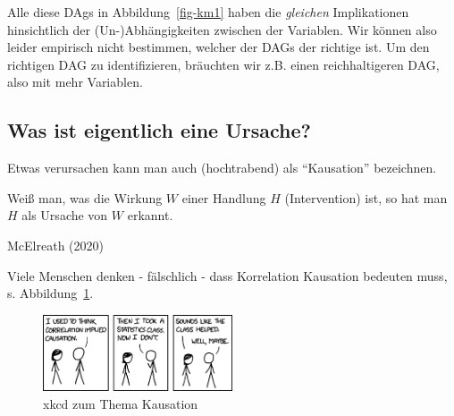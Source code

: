 \documentclass[
  a4paper,
  DIV=11]{scrreprt}
\theoremstyle{definition}
\theoremstyle{remark}
\begin{document}
Alle diese DAgs in Abbildung~\ref{fig-km1} haben die \emph{gleichen}
Implikationen hinsichtlich der (Un-)Abhängigkeiten zwischen der
Variablen. Wir können also leider empirisch nicht bestimmen, welcher der
DAGs der richtige ist. Um den richtigen DAG zu identifizieren, bräuchten
wir z.B. einen reichhaltigeren DAG, also mit mehr Variablen.

\hypertarget{was-ist-eigentlich-eine-ursache}{%
\subsection{Was ist eigentlich eine
Ursache?}\label{was-ist-eigentlich-eine-ursache}}

Etwas verursachen kann man auch (hochtrabend) als ``Kausation''
bezeichnen.

\begin{tcolorbox}[enhanced jigsaw, title=\textcolor{quarto-callout-note-color}{\faInfo}\hspace{0.5em}{Hinweis}, bottomtitle=1mm, bottomrule=.15mm, titlerule=0mm, colbacktitle=quarto-callout-note-color!10!white, colframe=quarto-callout-note-color-frame, leftrule=.75mm, left=2mm, toprule=.15mm, colback=white, arc=.35mm, breakable, toptitle=1mm, opacityback=0, rightrule=.15mm, coltitle=black, opacitybacktitle=0.6]

Weiß man, was die Wirkung \(W\) einer Handlung \(H\) (Intervention) ist,
so hat man \(H\) als Ursache von \(W\) erkannt.

\end{tcolorbox}

McElreath (2020)

Viele Menschen denken - fälschlich - dass Korrelation Kausation bedeuten
muss, s. Abbildung~\ref{fig-xkcd-causation}.

\begin{figure}

{\centering \includegraphics[width=0.5\textwidth,height=\textheight]{./img/correlation.png}

}

\caption{\label{fig-xkcd-causation}xkcd zum Thema Kausation}

\end{figure}
\end{document}
